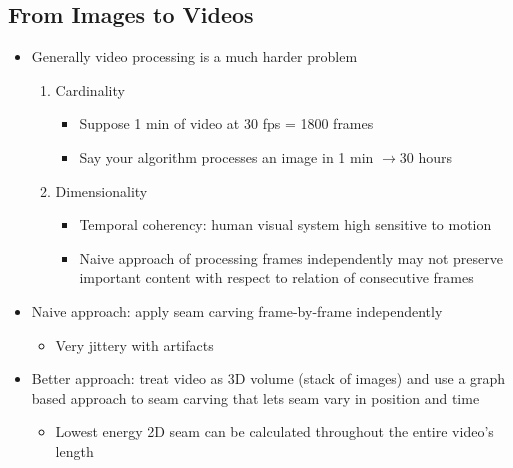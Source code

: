 \documentclass[letterpaper,12pt]{article}
\newcommand{\lra}{\ensuremath{\longrightarrow{}}}
\begin{document}
\subsection{From Images to Videos}
\begin{itemize}
 \item Generally video processing is a much harder problem
       \begin{enumerate}
        \item Cardinality
              \begin{itemize}
               \item Suppose 1 min of video at 30 fps = 1800 frames
               \item Say your algorithm processes an image in 1 min \lra 30 hours
              \end{itemize}
        \item Dimensionality
              \begin{itemize}
               \item Temporal coherency: human visual system high sensitive to motion
               \item Naive approach of processing frames independently may not preserve important content with respect to relation of consecutive frames
              \end{itemize}
       \end{enumerate}
 \item Naive approach: apply seam carving frame-by-frame independently
       \begin{itemize}
        \item Very jittery with artifacts
       \end{itemize}
 \item Better approach: treat video as 3D volume (stack of images) and use a graph based approach to seam carving that lets seam vary in position and time
       \begin{itemize}
        \item Lowest energy 2D seam can be calculated throughout the entire video's length
       \end{itemize}
\end{itemize}
\end{document}
